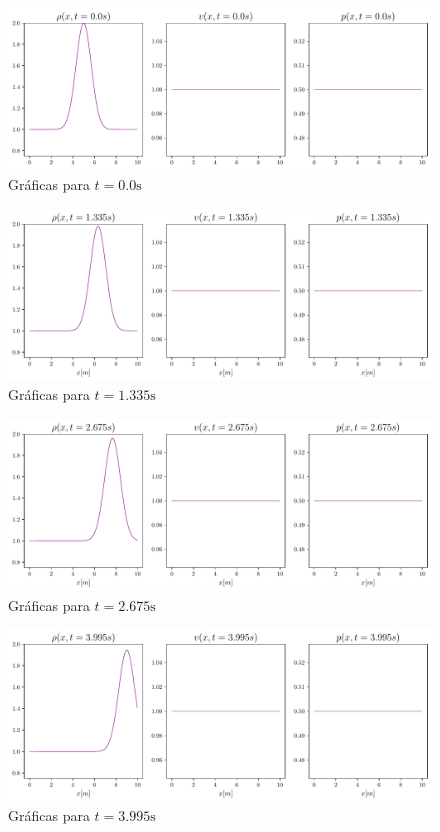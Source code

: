 \begin{figure}[ht]
	\centering
	\includegraphics[width=1\linewidth]{../euler1D/plots_en_TDG/set1/graficas/1.pdf}
	\caption{Gráficas para $t=0.0\unit{\s}$}
\end{figure}
\begin{figure}[ht]
	\includegraphics[width=1\linewidth]{../euler1D/plots_en_TDG/set1/135.pdf}
	\caption{Gráficas para $t=1.335\unit{\s}$}
\end{figure}\vspace{\baselineskip}
\begin{figure}[ht]
	\includegraphics[width=1\linewidth]{../euler1D/plots_en_TDG/set1/269.pdf}
	\caption{Gráficas para $t=2.675\unit{\s}$}
\end{figure}\vspace{\baselineskip}
\begin{figure}[ht]
	\includegraphics[width=1\linewidth]{../euler1D/plots_en_TDG/set1/401.pdf}
	\caption{Gráficas para $t=3.995\unit{\s}$}
\end{figure}
